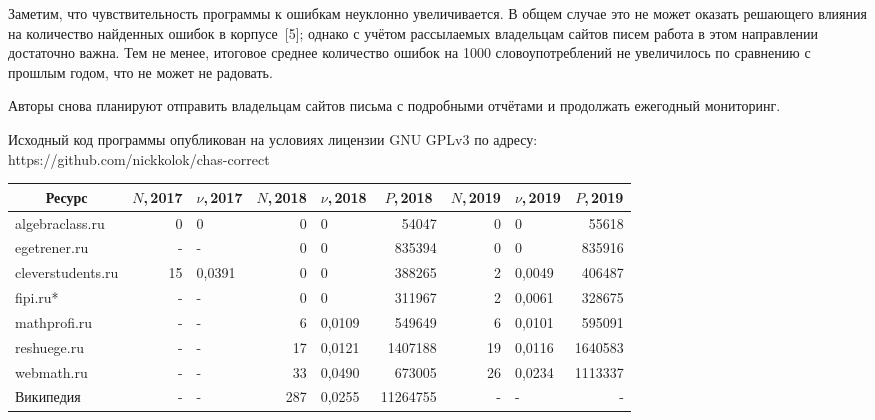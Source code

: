 Заметим, что чувствительность программы к ошибкам неук\-лон\-но увеличивается.
В общем случае это не может оказать решающего влияния на количество найденных ошибок в корпусе~[5];
однако с учётом рассылаемых владельцам сайтов писем работа в этом направлении достаточно важна.
Тем не менее,
итоговое среднее количество ошибок на 1000 словоупотреблений не увеличилось по сравнению с прошлым годом, что не может не радовать.

Авторы снова планируют отправить владельцам сайтов письма с подробными отчётами
и продолжать ежегодный мониторинг.

Исходный код программы опубликован на условиях лицензии GNU GPLv3 по адресу:
\\
https://github.com/nickkolok/chas-correct

{\footnotesize
\begin{landscape}
\begin{tabular}{|l|r|l|r|l|r|r|l|r|}
\hline
	\multicolumn{1}{|c|}{Ресурс}
  & \multicolumn{1}{|c|}{$N$,\,2017}
  & \multicolumn{1}{|c|}{$\nu$,\,2017}%
  & \multicolumn{1}{|c|}{$N$,\,2018}%
  & \multicolumn{1}{|c|}{$\nu$,\,2018}%
  & \multicolumn{1}{|c|}{$P$,\,2018}%
  & \multicolumn{1}{|c|}{$N$,\,2019}%
  & \multicolumn{1}{|c|}{$\nu$,\,2019}%
  & \multicolumn{1}{|c|}{$P$,\,2019}%
  \\
\hline
algebraclass.ru      &     0  & 0      &   0  & 0      &    54047  &    0  &  0       &    55618  \\
egetrener.ru         &     -  & -      &   0  & 0      &   835394  &    0  &  0       &   835916  \\
cleverstudents.ru    &    15  & 0,0391 &   0  & 0      &   388265  &    2  &  0,0049  &   406487  \\
fipi.ru*             &     -  & -      &   0  & 0      &   311967  &    2  &  0,0061  &   328675  \\
mathprofi.ru         &     -  & -      &   6  & 0,0109 &   549649  &    6  &  0,0101  &   595091  \\
reshuege.ru          &     -  & -      &  17  & 0,0121 &  1407188  &   19  &  0,0116  &  1640583  \\
webmath.ru           &     -  & -      &  33  & 0,0490 &   673005  &   26  &  0,0234  &  1113337  \\
Википедия            &     -  & -      & 287  & 0,0255 & 11264755  &    -  &  -       &        -  \\

\end{tabular}
\end{landscape}}
